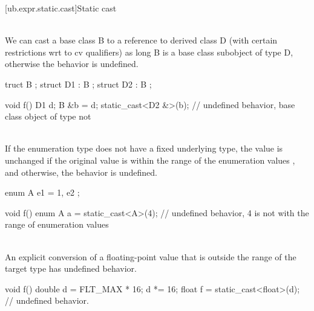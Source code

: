 {[ub.expr.static.cast]{Static cast}

\pnum
{} \\
We can cast a base class B to a reference to derived class D (with certain restrictions wrt to cv qualifiers)
as long B is a base class subobject of type D, otherwise the behavior is undefined.

\pnum
\begin{example}
\begin{codeblock}
truct B {};
struct D1 : B {};
struct D2 : B {};

void f() {
  D1 d;
  B &b = d;
  static_cast<D2 &>(b); // undefined behavior, base class object of type  not 
}
\end{codeblock}
\end{example}

\pnum
{} \\
If the enumeration type does not have a fixed underlying
type, the value is unchanged if the original value is within the range of the enumeration values , and
otherwise, the behavior is undefined.

\pnum
\begin{example}
\begin{codeblock}
enum A { e1 = 1, e2 };

void f() {
  enum A a = static_cast<A>(4); // undefined behavior, 4 is not with the range of enumeration values
}
\end{codeblock}
\end{example}

\pnum
{} \\
An explicit conversion of a
floating-point value that is outside the range of the
target type has undefined behavior.

\pnum
\begin{example}
\begin{codeblock}
void f() {
  double d = FLT_MAX * 16;
  d *= 16;
  float f = static_cast<float>(d);  // undefined behavior.
}
\end{codeblock}
\end{example}


\pnum
\begin{example}
\begin{codeblock}

\end{codeblock}
\end{example}

}
